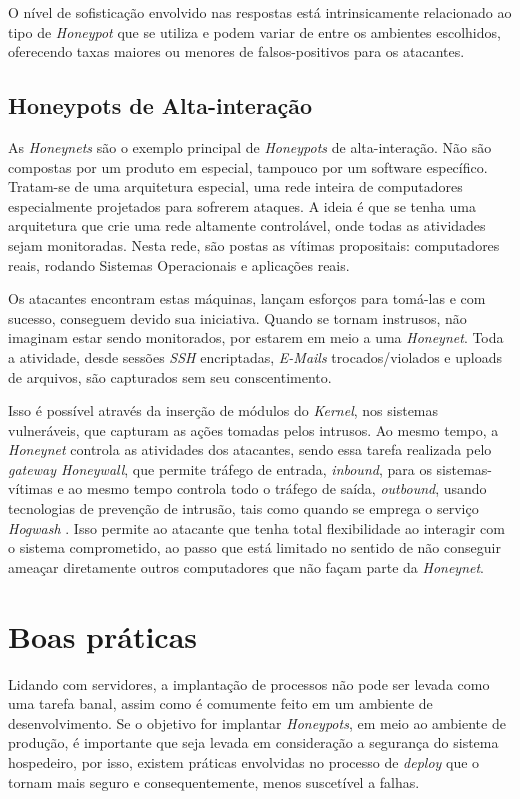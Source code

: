 O nível de sofisticação envolvido nas respostas está intrinsicamente relacionado ao tipo de \textit{Honeypot} que se utiliza e podem variar de entre os ambientes escolhidos, oferecendo taxas maiores ou menores de falsos-positivos para os atacantes.

\subsection{Honeypots de Alta-interação}

As \textit{Honeynets} são o exemplo principal de \textit{Honeypots} de alta-interação. Não são compostas por um produto em especial, tampouco por um software específico. Tratam-se de uma arquitetura especial, uma rede inteira de computadores especialmente projetados para sofrerem ataques. A ideia é que se tenha uma arquitetura que crie uma rede altamente controlável, onde todas as atividades sejam monitoradas. Nesta rede, são postas as vítimas propositais: computadores reais, rodando Sistemas Operacionais e aplicações reais.

Os atacantes encontram estas máquinas, lançam esforços para tomá-las e com sucesso, conseguem devido sua iniciativa. Quando se tornam instrusos, não imaginam estar sendo monitorados, por estarem em meio a uma \textit{Honeynet}. Toda a atividade, desde sessões \textit{SSH} encriptadas, \textit{E-Mails} trocados/violados e uploads de arquivos, são capturados sem seu conscentimento.

Isso é possível através da inserção de módulos do \textit{Kernel}, nos sistemas vulneráveis, que capturam as ações tomadas pelos intrusos. Ao mesmo tempo, a \textit{Honeynet} controla as atividades dos atacantes, sendo essa tarefa realizada pelo \textit{gateway Honeywall}, que permite tráfego de entrada, \textit{inbound}, para os sistemas-vítimas e ao mesmo tempo controla todo o tráfego de saída, \textit{outbound}, usando tecnologias de prevenção de intrusão, tais como quando se emprega o serviço \textit{Hogwash} \cite{Hogwash}. Isso permite ao atacante que tenha total flexibilidade ao interagir com o sistema comprometido, ao passo que está limitado no sentido de não conseguir ameaçar diretamente outros computadores que não façam parte da \textit{Honeynet}.


\section{Boas práticas}

Lidando com servidores, a implantação de processos não pode ser levada como uma tarefa banal, assim como é comumente feito em um ambiente de desenvolvimento. Se o objetivo for implantar \textit{Honeypots}, em meio ao ambiente de produção, é importante que seja levada em consideração a segurança do sistema hospedeiro, por isso, existem práticas envolvidas no processo de \textit{deploy} que o tornam mais seguro e consequentemente, menos suscetível a falhas.

